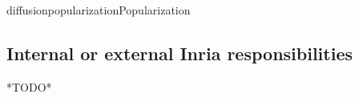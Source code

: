 \documentclass{ra2018}
\begin{document}
\begin{module}{diffusion}{popularization}{Popularization}



\subsection{Internal or external Inria responsibilities}
*TODO*


\end{module}
\end{document}
